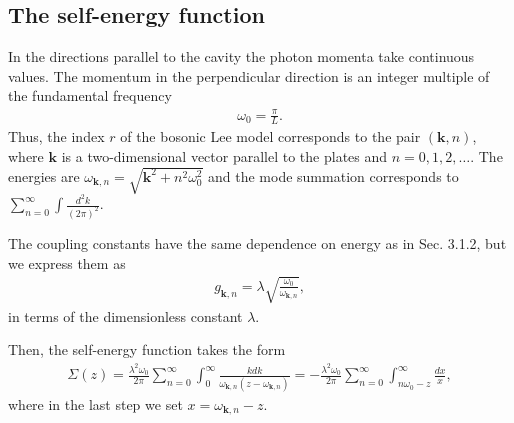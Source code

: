 \documentclass[12pt]{article}
\numberwithin{equation}{section}
\begin{document}
\subsection{The self-energy function}

In the directions parallel to the cavity the photon momenta take continuous values. The momentum in the perpendicular direction is an  integer multiple  of the fundamental frequency
\begin{eqnarray}
\omega_0 = \frac{\pi}{L}.
\end{eqnarray}
  Thus, the index $r$ of the bosonic Lee model corresponds to the pair $({\pmb k}, n)$, where ${\pmb k}$ is a two-dimensional vector parallel to the plates and $n = 0, 1, 2, \ldots$. The energies are $\omega_{{\pmb k},n} = \sqrt{{\pmb k}^2 +n^2 \omega_0^2}$ and the mode summation corresponds to $\sum_{n=0}^{\infty} \int \frac{d^2k}{(2\pi)^2}$.

 The coupling constants have the same dependence on energy as in Sec. 3.1.2, but we express them as
  \begin{eqnarray}
  g_{{\pmb k},n} = \lambda \sqrt{\frac{\omega_0}{\omega_{{\pmb k},n}} },
  \end{eqnarray}
  in terms of the dimensionless constant $\lambda$.

Then, the self-energy function takes the form
\begin{eqnarray}
\Sigma(z) = \frac{\lambda^2 \omega_0}{2\pi} \sum_{n=0}^{\infty}\int_0^{\infty} \frac{kdk}{\omega_{{\pmb k},n}(z- \omega_{{\pmb k},n})}  = - \frac{\lambda^2 \omega_0}{2\pi}  \sum_{n=0}^{\infty}  \int_{n \omega_0 -z}^{\infty} \frac{dx}{x}, \label{szcav0}
\end{eqnarray}
 where in the last step we set $x = \omega_{{\pmb k},n} - z$.
\end{document}
